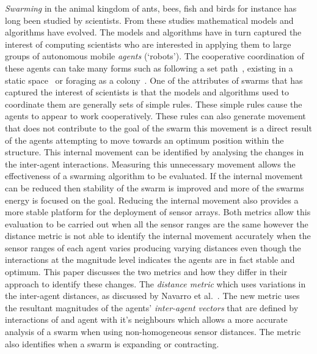 \documentclass{ieeeaccess}
\begin{document}
\emph{Swarming} in the animal kingdom of ants, bees, fish and birds for instance has long been studied by scientists. From these studies mathematical models and algorithms have evolved. The models and algorithms have in turn captured the interest of computing scientists who are interested in applying them to large groups of autonomous mobile \emph{agents} (`robots'). The cooperative coordination of these agents can take many forms such as following a set path~\cite{HCS:09}, existing in a static space~\cite{EP:10, GP:02, GP:04} or foraging as a colony~\cite{HER:11, GK:07}. One of the attributes of swarms that has captured the interest of scientists is that the models and algorithms used to coordinate them are generally sets of simple rules. These simple rules cause the agents to appear to work cooperatively. These rules can also generate movement that does not contribute to the goal of the swarm this movement is a direct result of the agents attempting to move towards an optimum position within the structure. This internal movement can be identified by analysing the changes in the inter-agent interactions. Measuring this unnecessary movement allows the effectiveness of a swarming algorithm to be evaluated. If the internal movement can be reduced then stability of the swarm is improved and more of the swarms energy is focused on the goal. Reducing the internal movement also provides a more stable platform for the deployment of sensor arrays. Both metrics allow this evaluation to be carried out when all the sensor ranges are the same however the distance metric is not able to identify the internal movement accurately when the sensor ranges of each agent varies producing varying distances even though the interactions at the magnitude level indicates the agents are in fact stable and optimum. This paper discusses the two metrics and how they differ in their approach to identify these changes. The \emph{distance metric} which uses variations in the inter-agent distances, as discussed by Navarro et al.~\cite{NIM:09}. The new metric uses the resultant magnitudes of the agents' \emph{inter-agent vectors} that are defined by interactions of and agent with it's neighbours which allows a more accurate analysis of a swarm when using non-homogeneous sensor distances. The metric also identifies when a swarm is expanding or contracting. 
\end{document}
